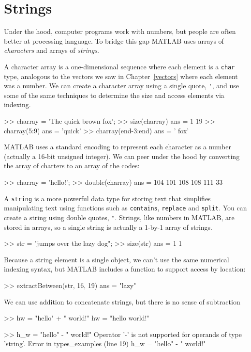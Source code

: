 \documentclass[../../book.tex]{subfiles}
\begin{document}
\section{Strings}

Under the hood, computer programs work with numbers, but people are often better at processing language.  To bridge this gap MATLAB uses arrays of \emph{characters} and arrays of \emph{strings}.

A character array is a one-dimensional sequence where each element is a \lstinline{char} type, analogous to the vectors we saw in Chapter~\ref{vectors} where each element was a number.   We can create a character array using a single quote, \lstinline{'}, and use some of the same techniques to determine the size and access elements via indexing.

\begin{code}
    >> charray = 'The quick brown fox';
    >> size(charray)
    ans =
         1    19
    >> charray(5:9)
    ans =
        'quick'
    >> charray(end-3:end)
    ans =
        ' fox'
\end{code}   

MATLAB uses a standard encoding to represent each character as a number (actually a 16-bit unsigned integer).  We can peer under the hood by converting the array of charters to an array of the codes:
\begin{code}
>> charray = 'hello!';
>> double(charray)
ans =
   104   101   108   108   111    33
\end{code}

A \lstinline{string} is a more powerful data type for storing text that simplifies manipulating text using functions such as \lstinline{contains}, \lstinline{replace} and \lstinline{split}.  You can create a string using double quotes, \lstinline{"}.  Strings, like numbers in MATLAB, are stored in arrays, so a single string is actually a 1-by-1 array of strings.

\begin{code}
>> str = "jumps over the lazy dog";
>> size(str)
ans =
     1     1
\end{code}
Because a string element is a single object, we can't use the same numerical indexing syntax, but MATLAB includes a function to support access by location:
\begin{code}
>> extractBetween(str, 16, 19)
ans = 
    "lazy"
\end{code}
We can use addition to concatenate strings, but there is no sense of subtraction
\begin{code}
>> hw = "hello" + " world!"
hw = 
    "hello world!"

>> h_w = "hello" - " world!"
Operator '-' is not supported for operands of type 'string'.
Error in types_examples (line 19)
h_w = "hello" - " world!"
\end{code}
\end{document}
